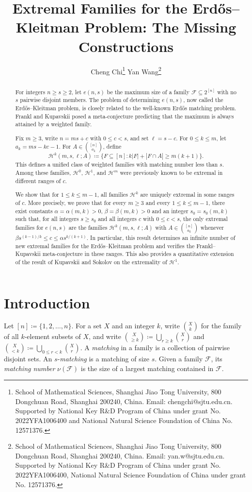 \documentclass[10pt,a4paper]{article}
\title{Extremal Families for the Erd\H{o}s--Kleitman Problem: The Missing Constructions}
\author{
    Cheng Chi\thanks{School of Mathematical Sciences, Shanghai Jiao Tong University, 800 Dongchuan Road, Shanghai 200240, China.
    Email: chengchi@sjtu.edu.cn.
    Supported by National Key R\&D Program of China under grant No. 2022YFA1006400 and National Natural Science Foundation of China No. 12571376.
    } \qquad Yan Wang\thanks{School of Mathematical Sciences, Shanghai Jiao Tong University, 800 Dongchuan Road, Shanghai 200240, China.
    Email: yan.w@sjtu.edu.cn.
    Supported by National Key R\&D Program of China under grant No. 2022YFA1006400, National Natural Science Foundation of China under grant No. 12571376.
    } }
\date{}
\numberwithin{equation}{section}
\theoremstyle{definition}
\newcommand{\F}{\mathcal F}
\begin{document}
\maketitle

\begin{abstract}
        For integers $n\ge s\ge2$, let $e(n,s)$ be the maximum size of a family $\F\subseteq2^{[n]}$ with no $s$ pairwise disjoint members.
        The problem of determining $e(n,s)$, now called the Erd\H{o}s--Kleitman problem, is closely related to the well-known Erd\H{o}s matching problem.
        Frankl and Kupavskii posed a meta-conjecture predicting that the maximum is always attained by a weighted family.

        Fix $m\ge3$, write $n=ms+c$ with $0\le c<s$, and set $\ell=s-c$.
        For $0\le k\le m$, let $a_k=ms-kc-1$.
        For $A\in\binom{[n]}{a_k}$, define
        \[
                \mathcal H^k(m,s,\ell;A)\coloneqq
                \{F\subseteq[n]: k|F|+|F\cap A|\ge m(k+1)\}.
        \]
        This defines a unified class of weighted families with matching number less than $s$.
        Among these families, $\mathcal H^0$, $\mathcal H^1$, and $\mathcal H^m$ were previously known to be extremal in different ranges of $c$.

        We show that for $1\le k\le m-1$, all families $\mathcal H^k$ are uniquely extremal in some ranges of $c$.
        More precisely, we prove that for every $m\ge3$ and every $1\le k\le m-1$, there exist constants $\alpha=\alpha(m,k)>0$, $\beta=\beta(m,k)>0$ and an integer $s_0=s_0(m,k)$ such that, for all integers $s\ge s_0$ and all integers $c$ with $0\le c<s$, the only extremal families for $e(n,s)$ are the families $\mathcal H^k(m,s,\ell;A)$ with $A\in\binom{[n]}{a_k}$ whenever $\beta s^{(k-1)/k}\le c\le \alpha s^{k/(k+1)}$.
        In particular, this result determines an infinite number of new extremal families for the Erd\H{o}s--Kleitman problem and verifies the Frankl--Kupavskii meta-conjecture in these ranges.
        This also provides a quantitative extension of the result of Kupavskii and Sokolov on the extremality of $\mathcal H^1$.
\end{abstract}


\section{Introduction}\label{sec:intro}

Let $[n]\coloneqq\{1,2,\ldots,n\}$.
For a set $X$ and an integer $k$, write $\binom Xk$ for the family of all $k$-element subsets of $X$, and write $\binom X{\ge k}\coloneqq\bigcup_{r\ge k}\binom Xr$ and $\binom X{<k}\coloneqq\bigcup_{0\le r<k}\binom Xr$.
A \emph{matching} in a family is a collection of pairwise disjoint sets.
An $s$-\emph{matching} is a matching of size $s$.
Given a family $\F$, its \emph{matching number} $\nu(\F)$ is the size of a largest matching contained in $\F$.
\end{document}
